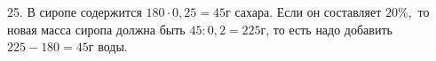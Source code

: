 25. В сиропе содержится $180\cdot0,25=45$г сахара. Если он составляет $20\%,$ то новая масса сиропа должна быть $45:0,2=225$г, то есть надо добавить $225-180=45$г воды.\\
